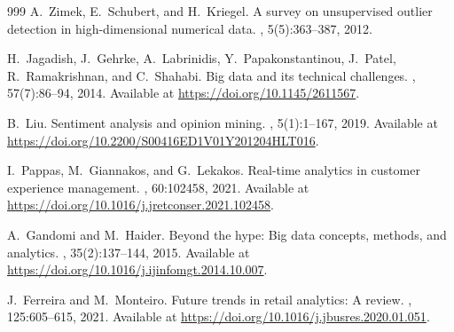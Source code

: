 \documentclass[12pt, a4paper,twoside]{report}
\theoremstyle{plain} %
\theoremstyle{definition} %
\theoremstyle{remark} %
\numberwithin{equation}{chapter}
\begin{document}
\begin{thebibliography}{999}
A.~Zimek, E.~Schubert, and H.~Kriegel.
\newblock A survey on unsupervised outlier detection in high-dimensional numerical data.
, 5(5):363--387, 2012.



H.~Jagadish, J.~Gehrke, A.~Labrinidis, Y.~Papakonstantinou, J.~Patel, R.~Ramakrishnan, and C.~Shahabi.
\newblock Big data and its technical challenges.
, 57(7):86--94, 2014.
\newblock Available at \url{https://doi.org/10.1145/2611567}.

B.~Liu.
\newblock Sentiment analysis and opinion mining.
, 5(1):1--167, 2019.
\newblock Available at \url{https://doi.org/10.2200/S00416ED1V01Y201204HLT016}.

I.~Pappas, M.~Giannakos, and G.~Lekakos.
\newblock Real-time analytics in customer experience management.
, 60:102458, 2021.
\newblock Available at \url{https://doi.org/10.1016/j.jretconser.2021.102458}.


A.~Gandomi and M.~Haider.
\newblock Beyond the hype: Big data concepts, methods, and analytics.
, 35(2):137--144, 2015.
\newblock Available at \url{https://doi.org/10.1016/j.ijinfomgt.2014.10.007}.

J.~Ferreira and M.~Monteiro.
\newblock Future trends in retail analytics: A review.
, 125:605--615, 2021.
\newblock Available at \url{https://doi.org/10.1016/j.jbusres.2020.01.051}.

\end{thebibliography}
\end{document}
